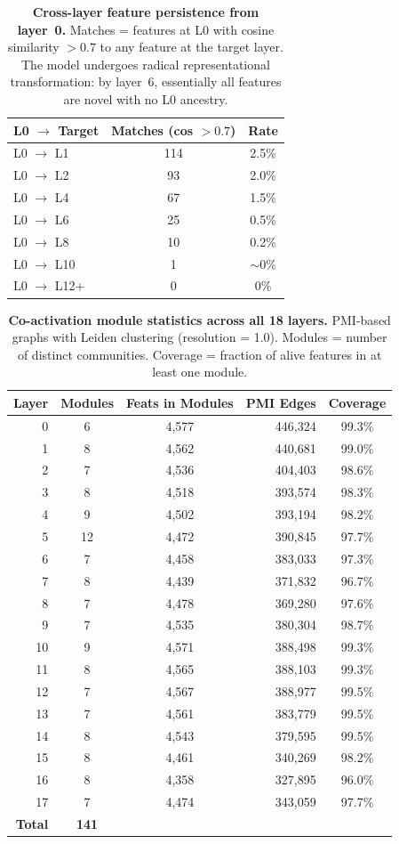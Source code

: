 \documentclass[11pt]{article}
\begin{document}
\begin{table}[H]
\centering
\caption{\textbf{Cross-layer feature persistence from layer~0.} Matches = features at L0 with cosine similarity $> 0.7$ to any feature at the target layer. The model undergoes radical representational transformation: by layer~6, essentially all features are novel with no L0 ancestry.}
\label{tab:persistence}
\smallskip
\begin{tabular}{lcc}
\toprule
L0 $\to$ Target & Matches (cos $> 0.7$) & Rate \\
\midrule
L0 $\to$ L1  & 114 & 2.5\% \\
L0 $\to$ L2  & 93 & 2.0\% \\
L0 $\to$ L4  & 67 & 1.5\% \\
L0 $\to$ L6  & 25 & 0.5\% \\
L0 $\to$ L8  & 10 & 0.2\% \\
L0 $\to$ L10 & 1 & $\sim$0\% \\
L0 $\to$ L12+ & 0 & 0\% \\
\bottomrule
\end{tabular}
\end{table}

\begin{table}[H]
\centering
\caption{\textbf{Co-activation module statistics across all 18 layers.} PMI-based graphs with Leiden clustering (resolution = 1.0). Modules = number of distinct communities. Coverage = fraction of alive features in at least one module.}
\label{tab:modules_full}
\smallskip
\begin{tabular}{rccrc}
\toprule
Layer & Modules & Feats in Modules & PMI Edges & Coverage \\
\midrule
0  & 6  & 4,577 & 446,324 & 99.3\% \\
1  & 8  & 4,562 & 440,681 & 99.0\% \\
2  & 7  & 4,536 & 404,403 & 98.6\% \\
3  & 8  & 4,518 & 393,574 & 98.3\% \\
4  & 9  & 4,502 & 393,194 & 98.2\% \\
5  & 12 & 4,472 & 390,845 & 97.7\% \\
6  & 7  & 4,458 & 383,033 & 97.3\% \\
7  & 8  & 4,439 & 371,832 & 96.7\% \\
8  & 7  & 4,478 & 369,280 & 97.6\% \\
9  & 7  & 4,535 & 380,304 & 98.7\% \\
10 & 9  & 4,571 & 388,498 & 99.3\% \\
11 & 8  & 4,565 & 388,103 & 99.3\% \\
12 & 7  & 4,567 & 388,977 & 99.5\% \\
13 & 7  & 4,561 & 383,779 & 99.5\% \\
14 & 8  & 4,543 & 379,595 & 99.5\% \\
15 & 8  & 4,461 & 340,269 & 98.2\% \\
16 & 8  & 4,358 & 327,895 & 96.0\% \\
17 & 7  & 4,474 & 343,059 & 97.7\% \\
\midrule
\textbf{Total} & \textbf{141} & & & \\
\bottomrule
\end{tabular}
\end{table}
\end{document}
